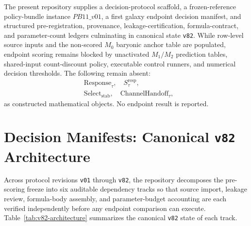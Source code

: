 \documentclass[11pt]{article}
\begin{document}
The present repository supplies a decision-protocol scaffold, a frozen-reference
policy-bundle instance \(PB11\_v01\), a first galaxy endpoint decision
manifest, and structured pre-registration, provenance, leakage-certification,
formula-contract, and parameter-count ledgers culminating in canonical state
\texttt{v82}. While row-level source inputs and the non-scored \(M_0\) baryonic
anchor table are populated, endpoint scoring remains blocked by unactivated
\(M_1/M_2\) prediction tables, shared-input count-discount policy, executable
control runners, and numerical decision thresholds. The following remain absent:
\[
\begin{aligned}
&\mathrm{Response}_{\tau}, \quad
S_{\tau}^{\mathrm{resp}},\\
&\mathrm{Select}_{\mathrm{stab}}, \quad
\mathrm{ChannelHandoff}_{\tau},
\end{aligned}
\]
as constructed mathematical objects. No endpoint result is reported.

\section{Decision Manifests: Canonical \texttt{v82} Architecture}
\label{sec:decision-manifests}

Across protocol revisions \texttt{v01} through \texttt{v82}, the repository
decomposes the pre-scoring freeze into six auditable dependency tracks so that
source import, leakage review, formula-body assembly, and parameter-budget
accounting are each verified independently before any endpoint comparison can
execute. Table~\ref{tab:v82-architecture} summarizes the canonical \texttt{v82}
state of each track.
\end{document}
